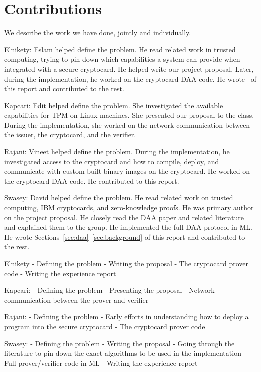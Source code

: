 \section{Contributions}

We describe the work we have done, jointly and individually.

Elnikety: Eslam helped define the problem.
He read related work in trusted computing, trying to pin down which capabilities a system can provide when integrated with a secure cryptocard.
He helped write our project proposal.
Later, during the implementation, he worked on the cryptocard DAA code.
He wrote~ of this report and contributed to the rest.

Kapcari: Edit helped define the problem.
She investigated the available capabilities for TPM on Linux machines.
She presented our proposal to the class.
During the implementation, she worked on the network communication between the issuer, the cryptocard, and the verifier.

Rajani: Vineet helped define the problem.
During the implementation, he investigated access to the cryptocard and how to compile, deploy, and communicate with custom-built binary images on the cryptocard.
He worked on the cryptocard DAA code.
He contributed to this report.

Swasey: David helped define the problem.
He read related work on trusted computing, IBM cryptocards, and zero-knowledge proofs.
He was primary author on the project proposal.
He closely read the DAA paper and related literature and explained them to the group.
He implemented the full DAA protocol in ML.
He wrote Sections~\ref{sec:daa}--\ref{sec:background} of this report and contributed to the rest.


\begin{comment}
	\emph{EE:} Aniket’s Summary of Contributions (no hosing)
\end{comment}

Elnikety
- Defining the problem
- Writing the proposal
- The cryptocard prover code
- Writing the experience report

Kapcari:
- Defining the problem
- Presenting the proposal
- Network communication between the prover and verifier

Rajani:
- Defining the problem
- Early efforts in understanding how to deploy a program into the secure
cryptocard
- The cryptocard prover code 

Swasey:
- Defining the problem
- Writing the proposal
- Going through the literature to pin down the exact algorithms to be used in
the implementation
- Full prover/verifier code in ML
- Writing the experience report

\fi